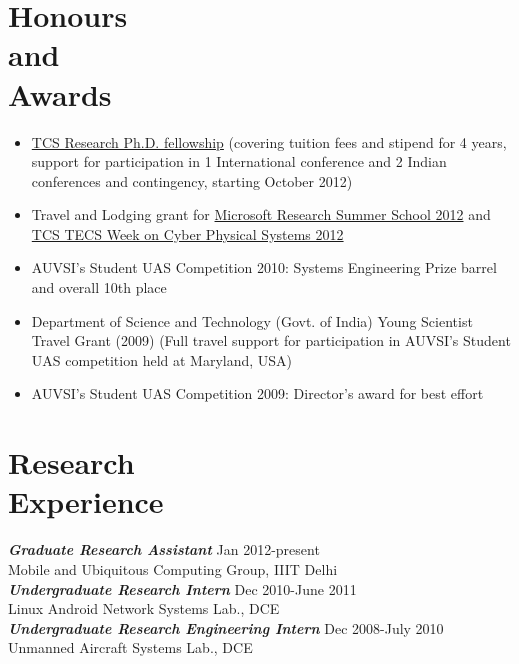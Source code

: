 \documentclass[margin]{res}
\begin{document}
\begin{resume}
\section{Honours \\and \\ Awards} \begin{itemize}  \itemsep -2pt %
                \item \href{http://www.tcs.com/about/tcs_difference/innovation/network/Pages/TCS_Research_Fellowship_Scheme.aspx}{TCS Research Ph.D. fellowship} (covering tuition fees and stipend for 4 years, support for participation in 1 International conference and 2 Indian conferences and contingency, starting October 2012) 
                \item Travel and Lodging grant for \href{http://research.microsoft.com/en-us/events/msri2012summerschool/}{Microsoft Research Summer School 2012} and \href{http://www.tcs-trddc.com/trddc_website/tecsweek/tecsweek_home.html}{TCS TECS Week on Cyber Physical Systems 2012}
                \item AUVSI's Student UAS Competition 2010: Systems Engineering Prize barrel and overall 10th place 
                \item Department of Science and Technology (Govt. of India) Young Scientist Travel Grant (2009) (Full travel support for participation in AUVSI's Student UAS competition held at Maryland, USA)
                \item AUVSI's Student UAS Competition 2009: Director's award for best effort
                
                \end{itemize}
 
\section{Research \\Experience} {\sl \textbf{Graduate Research Assistant}} \hfill Jan 2012-present \\
                Mobile and Ubiquitous Computing Group, IIIT Delhi\\
                {\sl \textbf{Undergraduate Research Intern}} \hfill Dec 2010-June 2011 \\
                Linux Android Network Systems Lab., DCE \\                
                {\sl \textbf{Undergraduate Research Engineering Intern}} \hfill Dec 2008-July 2010 \\
                Unmanned Aircraft Systems Lab., DCE
              


\end{resume}
\end{document}
